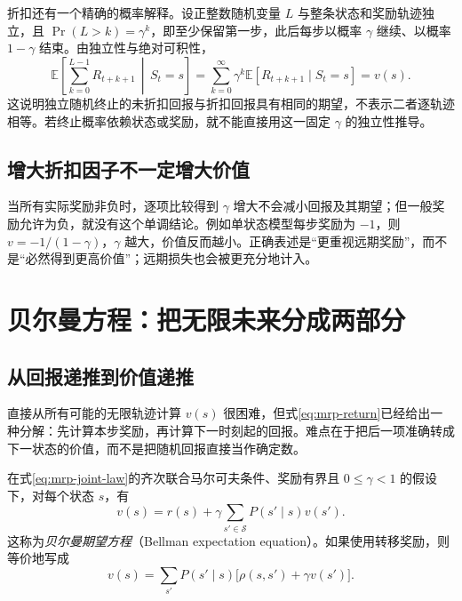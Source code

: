 \documentclass[UTF8,12pt,a4paper,fontset=fandol]{ctexart}
\begin{document}
折扣还有一个精确的概率解释。设正整数随机变量 $L$ 与整条状态和奖励轨迹独立，且 $\Pr(L>k)=\gamma^k$，即至少保留第一步，此后每步以概率 $\gamma$ 继续、以概率 $1-\gamma$ 结束。由独立性与绝对可积性，
\begin{equation}
  \mathbb E\!\left[\sum_{k=0}^{L-1}R_{t+k+1}\,\middle|\,S_t=s\right]
  =\sum_{k=0}^{\infty}\gamma^k\mathbb E[R_{t+k+1}\mid S_t=s]
  =v(s).
  \label{eq:mrp-random-horizon}
\end{equation}
这说明独立随机终止的未折扣回报与折扣回报具有相同的期望，不表示二者逐轨迹相等。若终止概率依赖状态或奖励，就不能直接用这一固定 $\gamma$ 的独立性推导。

\subsection{增大折扣因子不一定增大价值}

当所有实际奖励非负时，逐项比较得到 $\gamma$ 增大不会减小回报及其期望；但一般奖励允许为负，就没有这个单调结论。例如单状态模型每步奖励为 $-1$，则 $v=-1/(1-\gamma)$，$\gamma$ 越大，价值反而越小。正确表述是“更重视远期奖励”，而不是“必然得到更高价值”；远期损失也会被更充分地计入。

\section{贝尔曼方程：把无限未来分成两部分}
\label{sec:mrp-bellman}

\subsection{从回报递推到价值递推}

直接从所有可能的无限轨迹计算 $v(s)$ 很困难，但式\eqref{eq:mrp-return}已经给出一种分解：先计算本步奖励，再计算下一时刻起的回报。难点在于把后一项准确转成下一状态的价值，而不是把随机回报直接当作确定数。

\begin{theorem}
\label{thm:mrp-bellman}
在式\eqref{eq:mrp-joint-law}的齐次联合马尔可夫条件、奖励有界且 $0\leq\gamma<1$ 的假设下，对每个状态 $s$，有
\begin{equation}
  v(s)=r(s)+\gamma\sum_{s'\in\mathcal S}P(s'\mid s)v(s').
  \label{eq:mrp-bellman}
\end{equation}
这称为\emph{贝尔曼期望方程}（Bellman expectation equation）。如果使用转移奖励，则等价地写成
\begin{equation}
  v(s)=\sum_{s'}P(s'\mid s)\bigl[\rho(s,s')+\gamma v(s')\bigr].
  \label{eq:mrp-transition-bellman}
\end{equation}
\end{theorem}
\end{document}
